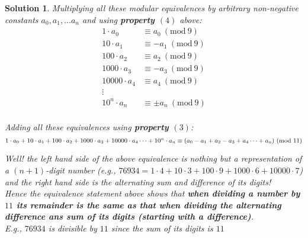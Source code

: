 \documentclass{article}
\newtheorem*{solution*}{Solution}
\newcommand{\Mod}[1]{\ (\mathrm{mod}\ #1)}
\begin{document}
\begin{solution*}
    Multiplying all these modular equivalences by arbitrary
    non-negative constants $a_0, a_1, \dots a_n$ and using
    \textbf{property $(4)$} above:
    \begin{align*}
        1\cdot{a_0} &\equiv a_0 \Mod 9\\
        10\cdot{a_1} &\equiv -a_1 \Mod 9\\
        100\cdot{a_2} &\equiv a_2 \Mod 9\\
        1000\cdot{a_3} &\equiv -a_3 \Mod 9\\
        10000\cdot{a_4} &\equiv a_4 \Mod 9\\
        \vdots\\
        10^n\cdot{a_n} &\equiv \pm a_n \Mod 9\\
    \end{align*}

    Adding all these equivalences using \textbf{property $(3)$}:
    \begin{equation*}
        1\cdot{a_0} + 10\cdot{a_1} + 100\cdot{a_2} + 1000\cdot{a_3} + 10000\cdot{a_4} \dots + 10^n\cdot{a_n} 
        \equiv
        (a_0 - a_1 + a_2 - a_3 + a_4 \dots + a_n) \Mod {11}\\
    \end{equation*}

    Well! the left hand side of the above equivalence is nothing
    but a representation of a $(n+1)$-digit number 
    (e.g., $76934 = 
    1\cdot{4} + 10\cdot{3} + 100\cdot{9} + 1000\cdot{6} + 10000\cdot{7}$)
    and the right hand side is the alternating sum and difference
    of its digits!\\

    Hence the equivalence statement above shows that 
    \textbf{when dividing a number by $11$ its remainder 
    is the same as that when dividing the alternating difference ans sum
    of its digits (starting with a difference)}.\\

    E.g., $76934$ is divisible by $11$
    since the sum of its digits is $11$
\end{solution*}
\end{document}
